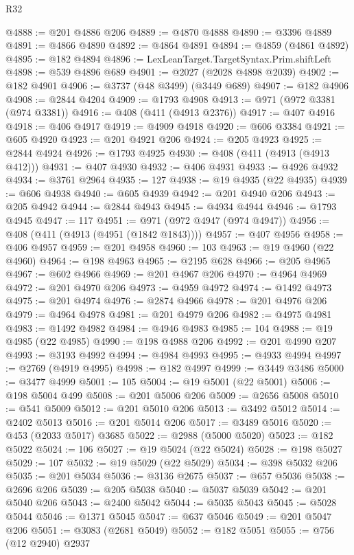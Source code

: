 \begin{lexlean}{R32}
\begin{coremodule}
@4888 := @201 @4886 @206
@4889 := @4870 @4888
@4890 := @3396 @4889
@4891 := @4866 @4890
@4892 := @4864 @4891
@4894 := @4859 (@4861 @4892)
@4895 := @182 @4894
@4896 := LexLeanTarget.TargetSyntax.Prim.shiftLeft
@4898 := @539 @4896 @689
@4901 := @2027 (@2028 @4898 @2039)
@4902 := @182 @4901
@4906 := @3737 (@48 @3499) (@3449 @689)
@4907 := @182 @4906
@4908 := @2844 @4204
@4909 := @1793 @4908
@4913 := @971 (@972 @3381 (@974 @3381))
@4916 := @408 (@411 (@4913 @2376))
@4917 := @407 @4916
@4918 := @406 @4917
@4919 := @4909 @4918
@4920 := @606 @3384
@4921 := @605 @4920
@4923 := @201 @4921 @206
@4924 := @205 @4923
@4925 := @2844 @4924
@4926 := @1793 @4925
@4930 := @408 (@411 (@4913 (@4913 @412)))
@4931 := @407 @4930
@4932 := @406 @4931
@4933 := @4926 @4932
@4934 := @3761 @2964
@4935 := 127
@4938 := @19 @4935 (@22 @4935)
@4939 := @606 @4938
@4940 := @605 @4939
@4942 := @201 @4940 @206
@4943 := @205 @4942
@4944 := @2844 @4943
@4945 := @4934 @4944
@4946 := @1793 @4945
@4947 := 117
@4951 := @971 (@972 @4947 (@974 @4947))
@4956 := @408 (@411 (@4913 (@4951 (@1842 @1843))))
@4957 := @407 @4956
@4958 := @406 @4957
@4959 := @201 @4958
@4960 := 103
@4963 := @19 @4960 (@22 @4960)
@4964 := @198 @4963
@4965 := @2195 @628
@4966 := @205 @4965
@4967 := @602 @4966
@4969 := @201 @4967 @206
@4970 := @4964 @4969
@4972 := @201 @4970 @206
@4973 := @4959 @4972
@4974 := @1492 @4973
@4975 := @201 @4974
@4976 := @2874 @4966
@4978 := @201 @4976 @206
@4979 := @4964 @4978
@4981 := @201 @4979 @206
@4982 := @4975 @4981
@4983 := @1492 @4982
@4984 := @4946 @4983
@4985 := 104
@4988 := @19 @4985 (@22 @4985)
@4990 := @198 @4988 @206
@4992 := @201 @4990 @207
@4993 := @3193 @4992
@4994 := @4984 @4993
@4995 := @4933 @4994
@4997 := @2769 (@4919 @4995)
@4998 := @182 @4997
@4999 := @3449 @3486
@5000 := @3477 @4999
@5001 := 105
@5004 := @19 @5001 (@22 @5001)
@5006 := @198 @5004 @499
@5008 := @201 @5006 @206
@5009 := @2656 @5008
@5010 := @541 @5009
@5012 := @201 @5010 @206
@5013 := @3492 @5012
@5014 := @2402 @5013
@5016 := @201 @5014 @206
@5017 := @3489 @5016
@5020 := @453 (@2033 @5017) @3685
@5022 := @2988 (@5000 @5020)
@5023 := @182 @5022
@5024 := 106
@5027 := @19 @5024 (@22 @5024)
@5028 := @198 @5027
@5029 := 107
@5032 := @19 @5029 (@22 @5029)
@5034 := @398 @5032 @206
@5035 := @201 @5034
@5036 := @3136 @2675
@5037 := @657 @5036
@5038 := @2696 @206
@5039 := @205 @5038
@5040 := @5037 @5039
@5042 := @201 @5040 @206
@5043 := @2400 @5042
@5044 := @5035 @5043
@5045 := @5028 @5044
@5046 := @1371 @5045
@5047 := @637 @5046
@5049 := @201 @5047 @206
@5051 := @3083 (@2681 @5049)
@5052 := @182 @5051
@5055 := @756 (@12 @2940) @2937

\end{coremodule}
\end{lexlean}

